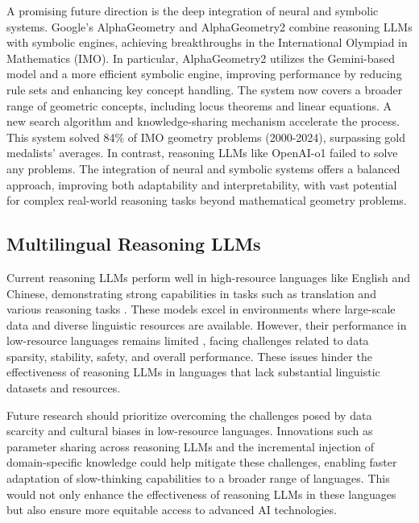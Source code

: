 A promising future direction is the deep integration of neural and symbolic systems. Google's AlphaGeometry \cite{trinh2024solving} and AlphaGeometry2 \cite{chervonyi2025gold} combine reasoning LLMs with symbolic engines, achieving breakthroughs in the International Olympiad in Mathematics (IMO). 
In particular, AlphaGeometry2 utilizes the Gemini-based model \cite{team2023gemini, team2024gemini, gemini2.0-pro} and a more efficient symbolic engine, improving performance by reducing rule sets and enhancing key concept handling. 
The system now covers a broader range of geometric concepts, including locus theorems and linear equations. 
A new search algorithm and knowledge-sharing mechanism accelerate the process. 
This system solved 84\% of IMO geometry problems (2000-2024), surpassing gold medalists' averages. 
In contrast, reasoning LLMs like OpenAI-o1 \cite{openai_o1} failed to solve any problems. 
The integration of neural and symbolic systems offers a balanced approach, improving both adaptability and interpretability, with vast potential for complex real-world reasoning tasks beyond mathematical geometry problems.




\subsection{Multilingual Reasoning LLMs}\label{mlan-srs}

Current reasoning LLMs perform well in high-resource languages like English and Chinese, demonstrating strong capabilities in tasks such as translation and various reasoning tasks \cite{DRT-o1, Marco_o1}. 
These models excel in environments where large-scale data and diverse linguistic resources are available. 
However, their performance in low-resource languages remains limited \cite{MGSM}, facing challenges related to data sparsity, stability, safety, and overall performance. 
These issues hinder the effectiveness of reasoning LLMs in languages that lack substantial linguistic datasets and resources.

Future research should prioritize overcoming the challenges posed by data scarcity and cultural biases in low-resource languages. 
Innovations such as parameter sharing across reasoning LLMs and the incremental injection of domain-specific knowledge could help mitigate these challenges, enabling faster adaptation of slow-thinking capabilities to a broader range of languages. 
This would not only enhance the effectiveness of reasoning LLMs in these languages but also ensure more equitable access to advanced AI technologies.


